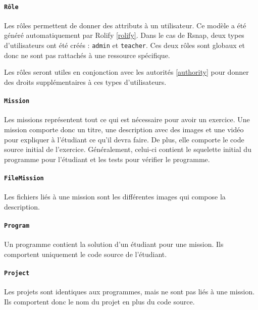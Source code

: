 \paragraph{\texttt{Rôle}} Les rôles permettent de donner des attributs à un utilisateur. Ce modèle a été généré automatiquement par Rolify \ref{rolify}. Dans le cas de Rsnap, deux types d'utilisateurs ont été créés : \texttt{admin} et \texttt{teacher}. Ces deux rôles sont globaux et donc ne sont pas rattachés à une ressource spécifique.%

Les rôles seront utiles en conjonction avec les autorités \ref{authority} pour donner des droits supplémentaires à ces types d'utilisateurs.

\paragraph{\texttt{Mission}} Les missions représentent tout ce qui est nécessaire pour avoir un exercice. Une mission comporte donc un titre, une description avec des images et une vidéo pour expliquer à l'étudiant ce qu'il devra faire. De plus, elle comporte le code source initial de l'exercice. Généralement, celui-ci contient le squelette initial du programme pour l'étudiant et les tests pour vérifier le programme. 

\paragraph{\texttt{FileMission}} Les fichiers liés à une mission sont les différentes images qui compose la description. %

\paragraph{\texttt{Program}} Un programme contient la solution d'un étudiant pour une mission. Ils comportent uniquement le code source de l'étudiant.

\paragraph{\texttt{Project}} Les projets sont identiques aux programmes, mais ne sont pas liés à une mission. Ils comportent donc le nom du projet en plus du code source.

